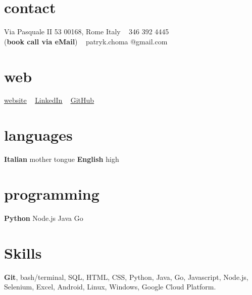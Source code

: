 \documentclass[]{cv-style}          %
\begin{document}
\lastupdated


\begin{aside}
%
\section{contact}
Via Pasquale II 53
00168, Rome
Italy
~
{\Telefon} 346 392 4445 \\(\textbf{book call via eMail})
~
{\Email} patryk.choma
@gmail.com
%
\section{web}
 \href{https://ch-pat.github.io/}{\underline{website}}
~
 \href{https://www.linkedin.com/in/p-choma/}{\underline{LinkedIn}}
~
 \href{https://github.com/ch-pat}{\underline{GitHub}}
%
\section{languages}
\textbf{Italian} mother tongue
\textbf{English} high
%
\section{programming}
\textbf{Python}
Node.js
Java
Go
%
\end{aside}


\section{Skills}
  \vspace{-0.4cm}
\textbf{Git}, bash/terminal, SQL, HTML, CSS, Python, Java, Go, Javascript, Node.js, Selenium, Excel, Android, Linux, Windows, Google Cloud Platform.

\end{document}
